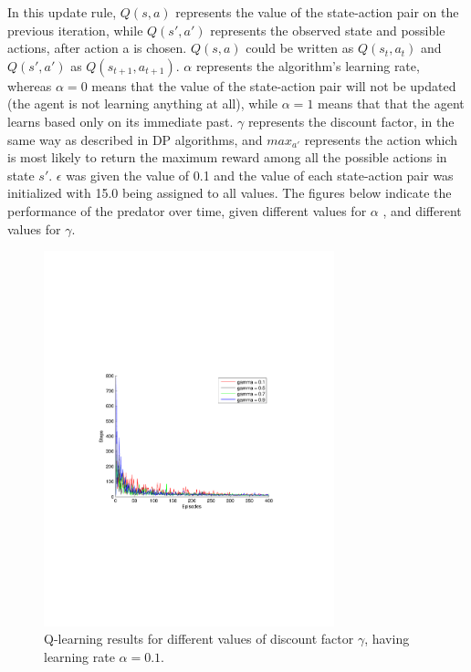 \documentclass[a4paper,11pt]{article}
\begin{document}
In this update rule, $Q(s,a)$ represents the value of the state-action pair on the previous iteration, while $Q(s',a')$ represents the observed state and possible actions, after action a is chosen. $Q(s,a)$ could be written as $Q(s_t,a_t)$ and $Q(s',a')$ as $Q(s_{t+1}, a_{t+1})$. $\alpha$ represents the algorithm's learning rate, whereas $\alpha =0$ means that the value of the state-action pair will not be updated (the agent is not learning anything at all), while $\alpha =1$ means that that the agent learns based only on its immediate past. $\gamma$ represents the discount factor, in the same way as described in DP algorithms, and $max_{a'}$ represents the action which is most likely to return the maximum reward among all the possible actions in state $s'$. $\epsilon$ was given the value of 0.1 and the value of each state-action pair was initialized with 15.0 being assigned to all values. The figures below indicate the performance of the predator over time, given different values for $\alpha$ , and different values for $\gamma$.
\begin{figure}[h!]
  \centering
    \includegraphics[trim=4cm 8.5cm 4cm 8.5cm,clip,width=0.75\textwidth]{figures/qla01.pdf}
    \caption{Q-learning results for different values of discount factor $\gamma$, having learning rate $\alpha = 0.1$.}
    \label{q01}
\end{figure}
~
\end{document}
